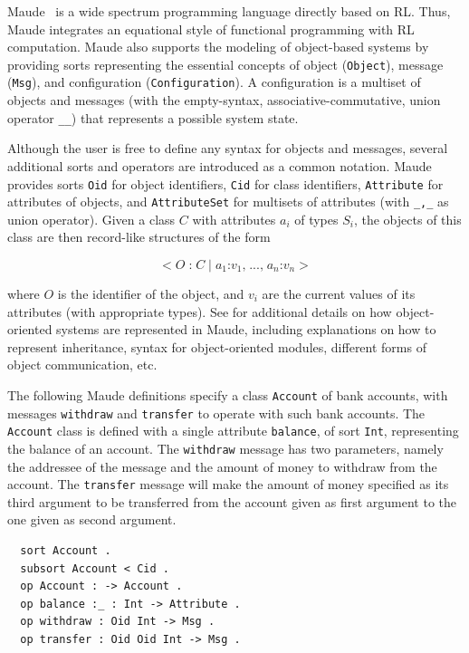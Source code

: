 Maude~\cite{CDELMMQ:2002,CDELMMT:2007-book} is a
wide spectrum programming language directly based on RL.
Thus, Maude integrates an
equational style of functional programming with RL computation.
Maude also supports the modeling of object-based systems by providing
sorts representing the essential concepts of object
(\texttt{Object}), message (\texttt{Msg}), and configuration
(\texttt{Configuration}). A configuration is a multiset of objects
and messages (with the empty-syntax, associative-commutative, union
operator \verb~__~) that represents a possible system
state.

Although the user is free to define any syntax for objects
and messages, several additional sorts and operators are introduced
as a common notation. Maude provides sorts \texttt{Oid} for object
identifiers, \texttt{Cid} for class identifiers, \texttt{Attribute}
for attributes of objects, and \texttt{AttributeSet} for multisets
of attributes (with \verb~_,_~ as union operator).
Given a class $C$ with attributes $a_i$ of types $S_i$, the objects
of this class are then record-like structures of the form

$$\texttt{<} \; O \; \texttt{:} \; C \; \texttt{|} \; a_1 \texttt{:}
v_1 \texttt{,} \; ... \texttt{,} \; a_n \texttt{:} v_n \;
\texttt{>}$$

\noindent where $O$ is the identifier of the object, and $v_i$
are the current values of its attributes (with appropriate types).
See \cite{CDELMMT:2007-book} for additional details on how
object-oriented systems are represented in Maude, including
explanations on how to represent inheritance, syntax for
object-oriented modules, different forms of object communication,
etc.

The following Maude definitions specify a class
\texttt{Account} of bank accounts, with messages \verb"withdraw" and
\verb"transfer" to operate with such bank accounts. The
\verb"Account" class is defined with a single attribute
\verb"balance", of sort \verb"Int", representing the balance of an
account. The \verb"withdraw" message has two parameters, namely the
addressee of the message and the amount of money to withdraw from
the account. The \verb"transfer" message will make the amount of
money specified as its third argument to be transferred from the
account given as first argument to the one given as second argument.

{\small
\begin{verbatim}
  sort Account .
  subsort Account < Cid .
  op Account : -> Account .
  op balance :_ : Int -> Attribute .
  op withdraw : Oid Int -> Msg .
  op transfer : Oid Oid Int -> Msg .
\end{verbatim}
}

